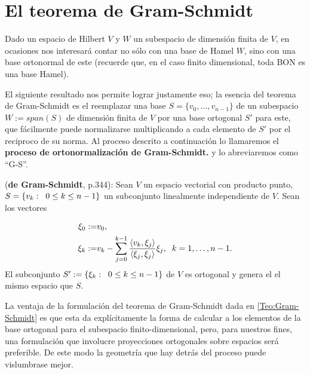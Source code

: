 \section{El teorema de Gram-Schmidt}
Dado un espacio de Hilbert $V$
y $W$ un subespacio de dimensión finita de $V$,
en ocasiones nos interesará contar no sólo con una
base de Hamel $W$, sino con una base ortonormal de este
(recuerde que, en el caso finito dimensional, toda
BON es una base Hamel).
 
El siguiente resultado nos permite lograr justamente eso;
la esencia del teorema de Gram-Schmidt es el reemplazar una base
$S=\{ v_{0}, \ldots ,v_{n-1} \}$ de un subespacio 
$W := span(S)$ de dimensión finita de $V$ 
por una base ortogonal $S'$ para este, que
fácilmente puede normalizarse multiplicando a cada elemento 
de $S'$ por el reciproco de su norma.
Al proceso descrito a continuación lo llamaremos
el \textbf{proceso de ortonormalización de Gram-Schmidt.}
y lo abreviaremos como ``G-S''.\\

\begin{teo} \label{Teo:Gram-Schmidt}
(\textbf{de Gram-Schmidt}, \cite{friedberg} p.344): 
Sean $V$ un espacio vectorial
con producto punto, $S=\{ v_{k} : \hspace{0.2cm} 0 \leq k \leq n-1 \}$ un
subconjunto linealmente independiente de $V$. 
Sean los vectores

\[
\begin{split}
\xi_{0}:= & v_{0}, \\
\xi_{k} := & v_{k} - \sum\limits_{j=0}^{k-1}
\frac{\langle v_{k} , \xi_{j} \rangle}{
\langle \xi_{j} , \xi_{j} \rangle}  \xi_{j},
\hspace{0.2cm} k=1, \ldots ,n-1.
\end{split}
\]
\noindent
El subconjunto 
$S':=\{ \xi_{k} : \hspace{0.2cm} 0 \leq k \leq n-1  \}$ de $V$
es ortogonal y genera el 
el mismo espacio que $S$.
\end{teo}


La ventaja de la formulación del teorema
de Gram-Schmidt dada en \ref{Teo:Gram-Schmidt}
es que esta
da explícitamente la forma de calcular a los
elementos de la base ortogonal para el subespacio
finito-dimensional, pero,
para nuestros fines, una formulación que
involucre proyecciones ortogonales sobre espacios
será preferible. De este modo la geometría
que hay detrás del proceso puede
vislumbrase mejor. 


